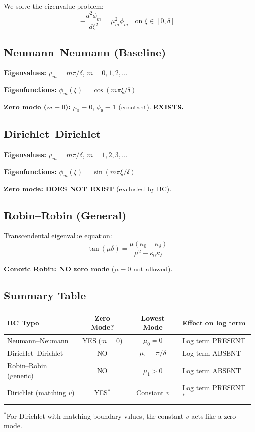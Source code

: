 \documentclass[11pt,a4paper]{article}
\begin{document}
We solve the eigenvalue problem:
\begin{equation}
-\frac{d^2\phi_m}{d\xi^2} = \mu_m^2 \phi_m \quad \text{on } \xi \in [0, \delta]
\end{equation}

\subsection{Neumann--Neumann (Baseline)}

\textbf{Eigenvalues:} $\mu_m = m\pi/\delta$, \quad $m = 0, 1, 2, \ldots$

\textbf{Eigenfunctions:} $\phi_m(\xi) = \cos(m\pi\xi/\delta)$

\textbf{Zero mode ($m=0$):} $\mu_0 = 0$, $\phi_0 = 1$ (constant). \textbf{EXISTS.}

\subsection{Dirichlet--Dirichlet}

\textbf{Eigenvalues:} $\mu_m = m\pi/\delta$, \quad $m = 1, 2, 3, \ldots$

\textbf{Eigenfunctions:} $\phi_m(\xi) = \sin(m\pi\xi/\delta)$

\textbf{Zero mode:} \textbf{DOES NOT EXIST} (excluded by BC).

\subsection{Robin--Robin (General)}

Transcendental eigenvalue equation:
\begin{equation}
\tan(\mu\delta) = \frac{\mu(\kappa_0 + \kappa_\delta)}{\mu^2 - \kappa_0\kappa_\delta}
\end{equation}

\textbf{Generic Robin: NO zero mode} ($\mu = 0$ not allowed).

\subsection{Summary Table}

\begin{center}
\begin{tabular}{@{}lccl@{}}
\toprule
BC Type & Zero Mode? & Lowest Mode & Effect on log term \\
\midrule
Neumann--Neumann & YES ($m=0$) & $\mu_0 = 0$ & Log term PRESENT \\
Dirichlet--Dirichlet & NO & $\mu_1 = \pi/\delta$ & Log term ABSENT \\
Robin--Robin (generic) & NO & $\mu_1 > 0$ & Log term ABSENT \\
Dirichlet (matching $v$) & YES$^*$ & Constant $v$ & Log term PRESENT$^*$ \\
\bottomrule
\end{tabular}
\end{center}
$^*$For Dirichlet with matching boundary values, the constant $v$ acts like a zero mode.
\end{document}
